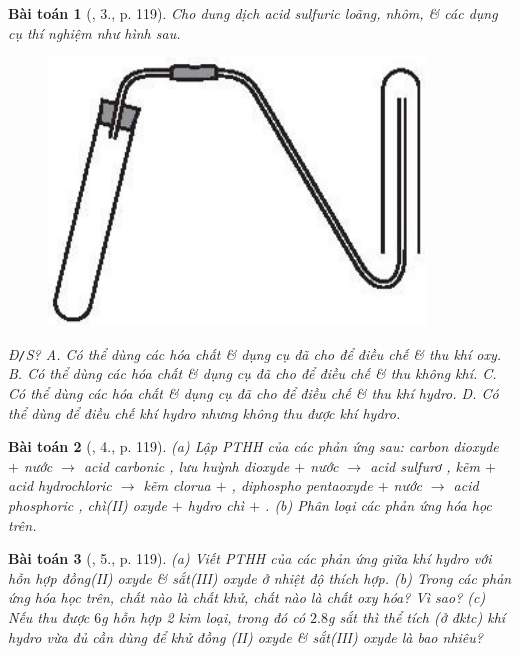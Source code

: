 \documentclass{article}
\newtheorem{baitoan}{Bài toán}
\begin{document}
\begin{baitoan}[\cite{SGK_Hoa_Hoc_8}, 3., p. 119]
	Cho dung dịch acid sulfuric loãng, nhôm, \& các dụng cụ thí nghiệm như hình sau.
	\begin{figure}[H]
		\centering
		\includegraphics[scale=.3]{SGK_Hoa_Hoc_8_58}
	\end{figure}
	\noindent\emph{Đ\texttt{/}S?} {\sf A.} Có thể dùng các hóa chất \& dụng cụ đã cho để điều chế \& thu khí oxy. {\sf B.} Có thể dùng các hóa chất \& dụng cụ đã cho để điều chế \& thu không khí. {\sf C.} Có thể dùng các hóa chất \& dụng cụ đã cho để điều chế \& thu khí hydro. {\sf D.} Có thể dùng để điều chế khí hydro nhưng không thu được khí hydro.
\end{baitoan}

\begin{baitoan}[\cite{SGK_Hoa_Hoc_8}, 4., p. 119]
	(a) Lập PTHH của các phản ứng sau: carbon dioxyde $+$ nước $\to$ acid carbonic \emph{}, lưu huỳnh dioxyde $+$ nước $\to$ acid sulfurơ \emph{}, kẽm $+$ acid hydrochloric $\to$ kẽm clorua $+$ \emph{}, diphospho pentaoxyde $+$ nước $\to$ acid phosphoric \emph{}, chì(II) oxyde $+$ hydro \ce{\to[$t^\circ$]} chì $+$ \emph{}. (b) Phân loại các phản ứng hóa học trên.
\end{baitoan}

\begin{baitoan}[\cite{SGK_Hoa_Hoc_8}, 5., p. 119]
	(a) Viết PTHH của các phản ứng giữa khí hydro với hỗn hợp đồng(II) oxyde \& sắt(III) oxyde ở nhiệt độ thích hợp. (b) Trong các phản ứng hóa học trên, chất nào là chất khử, chất nào là chất oxy hóa? Vì sao? (c) Nếu thu được $6$\emph{g} hỗn hợp 2 kim loại, trong đó có $2.8$\emph{g} sắt thì thể tích (ở đktc) khí hydro vừa đủ cần dùng để khử đồng (II) oxyde \& sắt(III) oxyde là bao nhiêu?
\end{baitoan}
\end{document}

